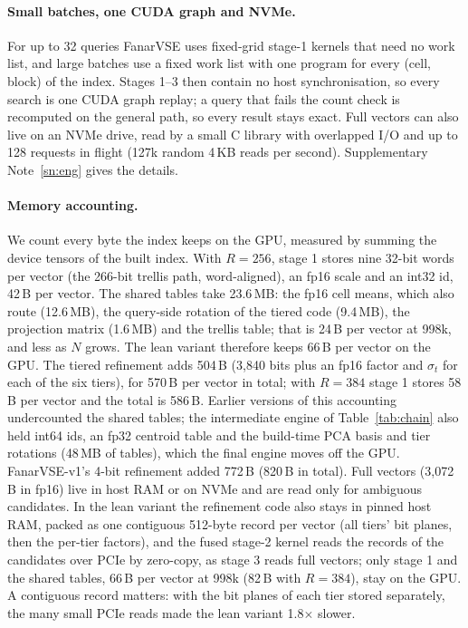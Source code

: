 \documentclass[fleqn,10pt]{wlscirep}
\begin{document}
\paragraph{Small batches, one CUDA graph and NVMe.} For up to 32 queries FanarVSE uses fixed-grid stage-1 kernels that need no work list, and large batches use a fixed work list with one program for every (cell, block) of the index. Stages 1--3 then contain no host synchronisation, so every search is one CUDA graph replay; a query that fails the count check is recomputed on the general path, so every result stays exact. Full vectors can also live on an NVMe drive, read by a small C library with overlapped I/O and up to 128 requests in flight (127k random 4\,KB reads per second). Supplementary Note~\ref{sn:eng} gives the details.

\paragraph{Memory accounting.} We count every byte the index keeps on the GPU, measured by summing the device tensors of the built index. With $R=256$, stage 1 stores nine 32-bit words per vector (the 266-bit trellis path, word-aligned), an fp16 scale and an int32 id, 42\,B per vector. The shared tables take 23.6\,MB: the fp16 cell means, which also route (12.6\,MB), the query-side rotation of the tiered code (9.4\,MB), the projection matrix (1.6\,MB) and the trellis table; that is 24\,B per vector at 998k, and less as $N$ grows. The lean variant therefore keeps 66\,B per vector on the GPU. The tiered refinement adds 504\,B (3{,}840 bits plus an fp16 factor and $\sigma_t$ for each of the six tiers), for 570\,B per vector in total; with $R=384$ stage 1 stores 58\,B per vector and the total is 586\,B. Earlier versions of this accounting undercounted the shared tables; the intermediate engine of Table~\ref{tab:chain} also held int64 ids, an fp32 centroid table and the build-time PCA basis and tier rotations (48\,MB of tables), which the final engine moves off the GPU. FanarVSE-v1's 4-bit refinement added 772\,B (820\,B in total). Full vectors (3{,}072\,B in fp16) live in host RAM or on NVMe and are read only for ambiguous candidates. In the lean variant the refinement code also stays in pinned host RAM, packed as one contiguous 512-byte record per vector (all tiers' bit planes, then the per-tier factors), and the fused stage-2 kernel reads the records of the candidates over PCIe by zero-copy, as stage 3 reads full vectors; only stage 1 and the shared tables, 66\,B per vector at 998k (82\,B with $R=384$), stay on the GPU. A contiguous record matters: with the bit planes of each tier stored separately, the many small PCIe reads made the lean variant 1.8$\times$ slower.
\end{document}
